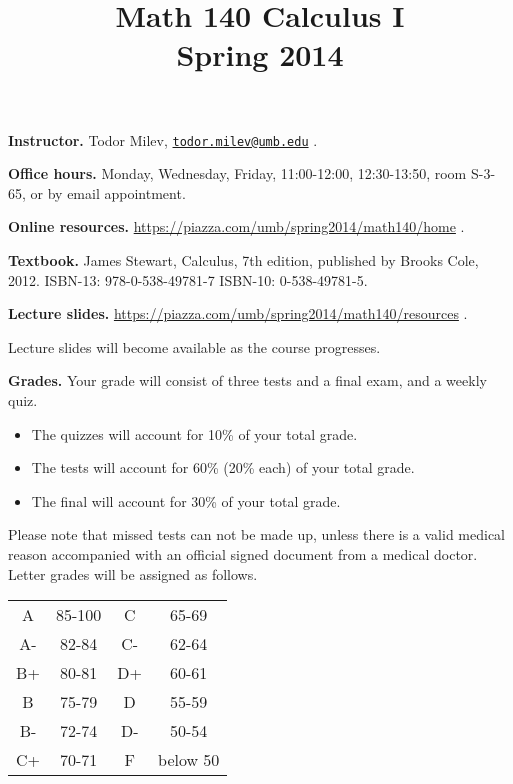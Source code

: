 \documentclass{article}
\title{Math 140 Calculus I \\ Spring 2014}
\begin{document}
\maketitle

\noindent \textbf{Instructor.} Todor Milev, \href{mailto:todor.milev@umb.edu}{\nolinkurl{todor.milev@umb.edu}} \quad \quad \quad .

\medskip
\noindent \textbf{Office hours. } Monday, Wednesday, Friday, 11:00-12:00, 12:30-13:50, room S-3-65, or by email appointment.

\medskip
\noindent \textbf{Online resources. }  \url{https://piazza.com/umb/spring2014/math140/home}  \quad \quad \quad .


\medskip\noindent \textbf{Textbook. }  James Stewart, Calculus, 7th edition, published by Brooks Cole, 2012. ISBN-13: 978-0-538-49781-7
ISBN-10: 0-538-49781-5.

\medskip \noindent \textbf{Lecture slides. } \url{https://piazza.com/umb/spring2014/math140/resources} \quad \quad \quad .

\medskip\noindent Lecture slides will become available as the course progresses.



\medskip
\noindent \textbf{Grades.} Your grade will consist of three tests and a final exam, and a weekly quiz. 
\begin{itemize}
\item The quizzes will account for 10\% of your total grade.
\item The tests will account for 60\% (20\% each) of your total grade.
\item The final will account for 30\% of your total grade.
\end{itemize}
Please note that missed tests can not be made up, unless there is a valid medical reason accompanied with an official signed document from a medical doctor. Letter grades will be assigned as follows. 

\begin{center}
\begin{tabular}{cc|cc}
A & 85-100 & C & 65-69 \\
A-& 82-84 & C- & 62-64 \\
B+& 80-81 & D+ & 60-61 \\
B & 75-79& D & 55-59\\
B-& 72-74& D- & 50-54\\
C+& 70-71& F & below 50\\
\end{tabular}

\end{center}
\end{document}
